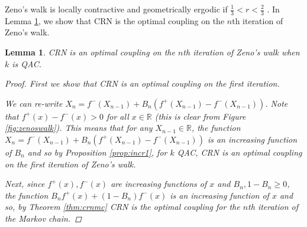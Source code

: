 \documentclass[12pt]{article}
\theoremstyle{plain}%
\newtheorem{lemma}[theorem]{Lemma}
\theoremstyle{definition}
\begin{document}
Zeno's walk is locally contractive and geometrically ergodic if $\frac{1}{3}<r<\frac{2}{3}$ \cite{localcont}. In Lemma \ref{lem:zeno}, we show that CRN is the optimal coupling on the $n$th iteration of Zeno's walk.
\begin{lemma}\label{lem:zeno}
	CRN is an optimal coupling on the $n$th iteration of Zeno's walk when $k$ is QAC. 
	\begin{proof}
		First we show that CRN is an optimal coupling on the first iteration.
		
		We can re-write $X_n=f^{-}(X_{n-1}) + B_n (f^{+}(X_{n-1})-f^{-}(X_{n-1}))$.
		Note that $f^{+}(x)-f^{-}(x)>0$ for all $x\in\mathbb{R}$ (this is clear from Figure \ref{fig:zenoswalk}).%
		This means that for any $X_{n-1}\in \mathbb{R}$, the function $X_n=f^{-}(X_{n-1}) + B_n (f^{+}(X_{n-1})-f^{-}(X_{n-1}))$ is an increasing function of $B_n$ and so by Proposition \ref{prop:incr1},  for $k$ QAC, CRN is an optimal coupling on the first iteration of Zeno's walk.
		
		Next, since $f^{+}(x), f^{-}(x)$ are increasing functions of $x$ and $B_n,1-B_n\geq 0$, the function $B_n f^{+}(x)+(1-B_n)f^{-}(x)$ is an increasing function of $x$ and so, by Theorem \ref{thm:crnmc} CRN is the optimal coupling for the $n$th iteration of the Markov chain.   
	\end{proof}
\end{lemma}

\end{document}
